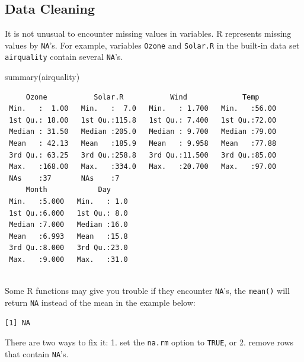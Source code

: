 \documentclass[
  letterpaper,
  DIV=11,
  numbers=noendperiod]{scrreprt}
\newenvironment{Shaded}{\begin{snugshade}}{\end{snugshade}}
\newcommand{\FunctionTok}[1]{\textcolor[rgb]{0.28,0.35,0.67}{#1}}
\newcommand{\NormalTok}[1]{\textcolor[rgb]{0.00,0.23,0.31}{#1}}
\newcommand{\SpecialCharTok}[1]{\textcolor[rgb]{0.37,0.37,0.37}{#1}}
\begin{document}
\subsection{Data Cleaning}\label{data-cleaning-1}

It is not unusual to encounter missing values in variables. R represents
missing values by \texttt{NA}'s. For example, variables \texttt{Ozone}
and \texttt{Solar.R} in the built-in data set \texttt{airquality}
contain several \texttt{NA}'s.

\begin{Shaded}
\begin{Highlighting}[]
\FunctionTok{summary}\NormalTok{(airquality)}
\end{Highlighting}
\end{Shaded}

\begin{verbatim}
     Ozone           Solar.R           Wind             Temp      
 Min.   :  1.00   Min.   :  7.0   Min.   : 1.700   Min.   :56.00  
 1st Qu.: 18.00   1st Qu.:115.8   1st Qu.: 7.400   1st Qu.:72.00  
 Median : 31.50   Median :205.0   Median : 9.700   Median :79.00  
 Mean   : 42.13   Mean   :185.9   Mean   : 9.958   Mean   :77.88  
 3rd Qu.: 63.25   3rd Qu.:258.8   3rd Qu.:11.500   3rd Qu.:85.00  
 Max.   :168.00   Max.   :334.0   Max.   :20.700   Max.   :97.00  
 NAs    :37       NAs    :7                                       
     Month            Day      
 Min.   :5.000   Min.   : 1.0  
 1st Qu.:6.000   1st Qu.: 8.0  
 Median :7.000   Median :16.0  
 Mean   :6.993   Mean   :15.8  
 3rd Qu.:8.000   3rd Qu.:23.0  
 Max.   :9.000   Max.   :31.0  
                               
\end{verbatim}

Some R functions may give you trouble if they encounter \texttt{NA}'s,
the \texttt{mean()} will return \texttt{NA} instead of the mean in the
example below:

\begin{Shaded}
\end{Shaded}

\begin{verbatim}
[1] NA
\end{verbatim}

There are two ways to fix it: 1. set the \texttt{na.rm} option to
\texttt{TRUE}, or 2. remove rows that contain \texttt{NA}'s.
\end{document}

